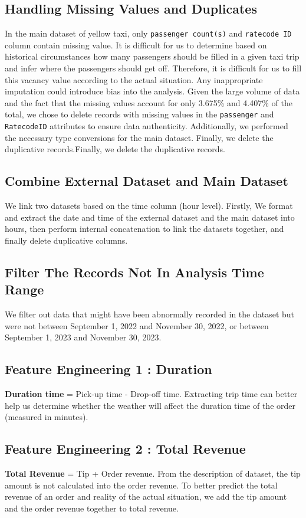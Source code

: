 \documentclass[11pt]{article}
\begin{document}
\subsection{Handling Missing Values and Duplicates}
In the main dataset of yellow taxi, only \texttt{passenger count(s)} and \texttt{ratecode ID} column contain missing value. It is difficult for us to determine based on historical circumstances how many passengers should be filled in a given taxi trip and infer where the passengers should get off. Therefore, it is difficult for us to fill this vacancy value according to the actual situation. Any inappropriate imputation could introduce bias into the analysis. Given the large volume of data and the fact that the missing values account for only 3.675\% and 4.407\% of the total, we chose to delete records with missing values in the \texttt{passenger} and \texttt{RatecodeID} attributes to ensure data authenticity. Additionally, we performed the necessary type conversions for the main dataset. Finally, we delete the duplicative records.Finally, we delete the duplicative records.

\subsection{Combine External Dataset and Main Dataset} 
We link two datasets based on the time column (hour level). Firstly, We format and extract the date and time of the external dataset and the main dataset into hours, then perform internal concatenation to link the datasets together, and finally delete duplicative columns.

\subsection{Filter The Records Not In Analysis Time Range}

We filter out data that might have been abnormally recorded in the dataset but were not between September 1, 2022 and November 30, 2022, or between September 1, 2023 and November 30, 2023.

\subsection {Feature Engineering 1 : Duration} \textbf{Duration time} = Pick-up time - Drop-off time. Extracting trip time can better help us determine whether the weather will affect the duration time of the order (measured in minutes).

\subsection {Feature Engineering 2 : Total Revenue}
\textbf{Total Revenue} = Tip + Order revenue. From the description of dataset, the tip amount is not calculated into the order revenue. To better predict the total revenue of an order and reality of the actual situation, we add the tip amount and the order revenue together to total revenue.
\end{document}
